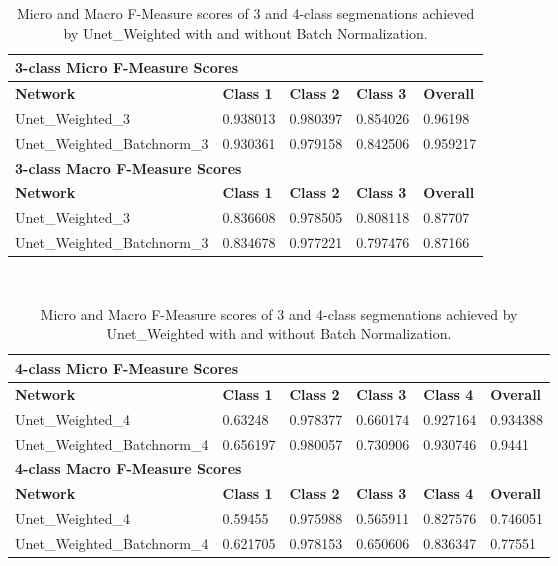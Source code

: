 \begin {table}
	\begin{flushleft}
		\begin {tabular}[!ht]{|l|l|l|l|l|}
			\hline\multicolumn{5}{|l|}{\textbf{3-class Micro F-Measure Scores}} \\ \hline
			\textbf{Network}& \textbf{Class 1}& \textbf{Class 2}& \textbf{Class 3}& \textbf{Overall} \\ \hline
			Unet\_Weighted\_3& \cellcolor{green!25}0.938013& \cellcolor{green!25}0.980397& \cellcolor{green!25}0.854026& \cellcolor{green!25}0.96198 \\ \hline
			Unet\_Weighted\_Batchnorm\_3& 0.930361&  0.979158& 0.842506& 0.959217\\ \hline
			\multicolumn{5}{|l|}{\textbf{3-class Macro F-Measure Scores}} \\ \hline
			\textbf{Network}& \textbf{Class 1}& \textbf{Class 2}& \textbf{Class 3}& \textbf{Overall} \\ \hline
			Unet\_Weighted\_3& \cellcolor{green!25}0.836608& \cellcolor{green!25}0.978505& \cellcolor{green!25}0.808118& \cellcolor{green!25}0.87707 \\ \hline
			Unet\_Weighted\_Batchnorm\_3& 0.834678& 0.977221& 0.797476& 0.87166\\ \hline
		\end {tabular}
		\vspace{0.5cm}\\
		\begin {tabular}[!ht]{|l|l|l|l|l|l|}
			\hline\multicolumn{6}{|l|}{\textbf{4-class Micro F-Measure Scores}} \\ \hline
			\textbf{Network}& \textbf{Class 1}& \textbf{Class 2}& \textbf{Class 3}& \textbf{Class 4}& \textbf{Overall} \\ \hline
			Unet\_Weighted\_4& 0.63248& 0.978377& 0.660174& 0.927164& 0.934388 \\ \hline
			Unet\_Weighted\_Batchnorm\_4& \cellcolor{green!25}0.656197& \cellcolor{green!25}0.980057& \cellcolor{green!25}0.730906& \cellcolor{green!25}0.930746& \cellcolor{green!25}0.9441\\ \hline
			\multicolumn{6}{|l|}{\textbf{4-class Macro F-Measure Scores}} \\ \hline
			\textbf{Network}& \textbf{Class 1}& \textbf{Class 2}& \textbf{Class 3}& \textbf{Class 4}& \textbf{Overall} \\ \hline
			Unet\_Weighted\_4& 0.59455& 0.975988& 0.565911& 0.827576& 0.746051 \\ \hline
			Unet\_Weighted\_Batchnorm\_4& \cellcolor{green!25}0.621705& \cellcolor{green!25}0.978153& \cellcolor{green!25}0.650606& \cellcolor{green!25}0.836347& \cellcolor{green!25}0.77551\\ \hline
		\end {tabular}
	\end {flushleft}

\caption[Micro and Macro F-Measure scores for a network with and without Batch Normalization.]{Micro and Macro F-Measure scores of 3 and 4-class segmenations achieved by Unet\_Weighted with and without Batch Normalization.}
\label{tab:results2}
\end {table}


